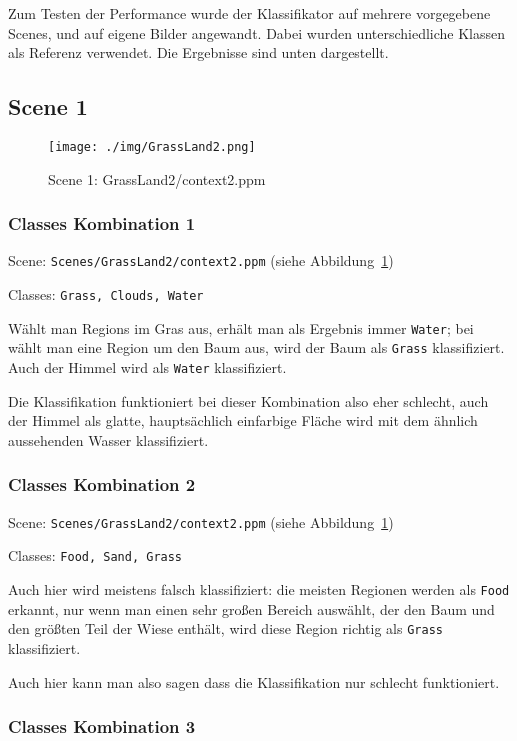 Zum Testen der Performance wurde der Klassifikator auf mehrere vorgegebene Scenes, und auf eigene Bilder angewandt. Dabei wurden unterschiedliche Klassen als Referenz verwendet. Die Ergebnisse sind unten dargestellt.


\subsection{Scene 1}

\begin{figure}[htb!]
 \centering
 \texttt{[image: ./img/GrassLand2.png]}
 \caption{Scene 1: GrassLand2/context2.ppm}
 \label{fig:GL2_context2}
\end{figure}


\subsubsection{Classes Kombination 1}

Scene: \texttt{Scenes/GrassLand2/context2.ppm} (siehe Abbildung~\ref{fig:GL2_context2})

Classes: \texttt{Grass, Clouds, Water}

Wählt man Regions im Gras aus, erhält man als Ergebnis immer \texttt{Water}; bei wählt man eine Region um den Baum aus, wird der Baum als \texttt{Grass} klassifiziert. Auch der Himmel wird als \texttt{Water} klassifiziert.

Die Klassifikation funktioniert bei dieser Kombination also eher schlecht, auch der Himmel als glatte, hauptsächlich einfarbige Fläche wird mit dem ähnlich aussehenden Wasser klassifiziert.


\subsubsection{Classes Kombination 2}

Scene: \texttt{Scenes/GrassLand2/context2.ppm} (siehe Abbildung~\ref{fig:GL2_context2})

Classes: \texttt{Food, Sand, Grass}

Auch hier wird meistens falsch klassifiziert: die meisten Regionen werden als \texttt{Food} erkannt, nur wenn man einen sehr großen Bereich auswählt, der den Baum und den größten Teil der Wiese enthält, wird diese Region richtig als \texttt{Grass} klassifiziert.

Auch hier kann man also sagen dass die Klassifikation nur schlecht funktioniert.


\subsubsection{Classes Kombination 3}

